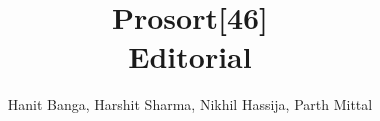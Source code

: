 \documentclass{article}
\title{Prosort[46]\\Editorial}
\author{Hanit Banga, Harshit Sharma, Nikhil Hassija, Parth Mittal}
\begin{document}
	\maketitle
	\tableofcontents

	
	
	
	
	

\pagebreak

\end{document}
